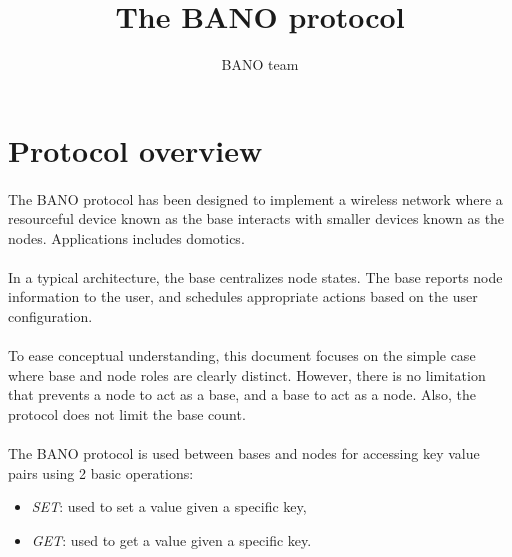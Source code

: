 \documentclass[a4paper, 11pt]{article}
\begin{document}
\title{The BANO protocol}
\author{BANO team}
\date{}

\maketitle



\clearpage
\section{Protocol overview}

\paragraph{}
The BANO protocol has been designed to implement a wireless network where a
resourceful device known as the base interacts with smaller devices known as
the nodes. Applications includes domotics.

\paragraph{}
In a typical architecture, the base centralizes node states. The base reports
node information to the user, and schedules appropriate actions based on the
user configuration.

\paragraph{}
To ease conceptual understanding, this document focuses on the simple case where
base and node roles are clearly distinct. However, there is no limitation that
prevents a node to act as a base, and a base to act as a node. Also, the protocol
does not limit the base count.

\paragraph{}
The BANO protocol is used between bases and nodes for accessing key value pairs
using 2 basic operations:
\begin{itemize}
\item \textit{SET}: used to set a value given a specific key,
\item \textit{GET}: used to get a value given a specific key.
\end{itemize}
\end{document}
